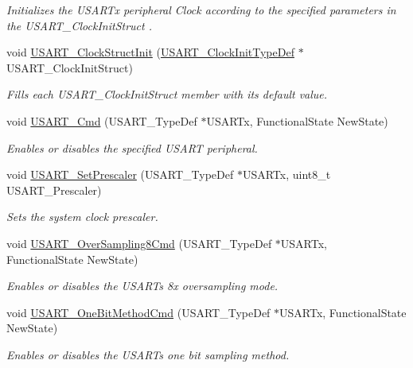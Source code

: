 \begin{DoxyCompactItemize}
\begin{DoxyCompactList}\small\item\em Initializes the U\+S\+A\+R\+Tx peripheral Clock according to the specified parameters in the U\+S\+A\+R\+T\+\_\+\+Clock\+Init\+Struct . \end{DoxyCompactList}\item 
void \mbox{\hyperlink{group___u_s_a_r_t___group1_ga59df27d0adda18b16ee28d47672cc724}{U\+S\+A\+R\+T\+\_\+\+Clock\+Struct\+Init}} (\mbox{\hyperlink{struct_u_s_a_r_t___clock_init_type_def}{U\+S\+A\+R\+T\+\_\+\+Clock\+Init\+Type\+Def}} $\ast$U\+S\+A\+R\+T\+\_\+\+Clock\+Init\+Struct)
\begin{DoxyCompactList}\small\item\em Fills each U\+S\+A\+R\+T\+\_\+\+Clock\+Init\+Struct member with its default value. \end{DoxyCompactList}\item 
void \mbox{\hyperlink{group___u_s_a_r_t___group1_ga45e51626739c5f22a6567c8a85d1d85e}{U\+S\+A\+R\+T\+\_\+\+Cmd}} (U\+S\+A\+R\+T\+\_\+\+Type\+Def $\ast$U\+S\+A\+R\+Tx, Functional\+State New\+State)
\begin{DoxyCompactList}\small\item\em Enables or disables the specified U\+S\+A\+RT peripheral. \end{DoxyCompactList}\item 
void \mbox{\hyperlink{group___u_s_a_r_t___group1_gaf5da8f2eee8245425584d85d4f62cc33}{U\+S\+A\+R\+T\+\_\+\+Set\+Prescaler}} (U\+S\+A\+R\+T\+\_\+\+Type\+Def $\ast$U\+S\+A\+R\+Tx, uint8\+\_\+t U\+S\+A\+R\+T\+\_\+\+Prescaler)
\begin{DoxyCompactList}\small\item\em Sets the system clock prescaler. \end{DoxyCompactList}\item 
void \mbox{\hyperlink{group___u_s_a_r_t___group1_ga3897bab07491d9239f8a238a9a7cddea}{U\+S\+A\+R\+T\+\_\+\+Over\+Sampling8\+Cmd}} (U\+S\+A\+R\+T\+\_\+\+Type\+Def $\ast$U\+S\+A\+R\+Tx, Functional\+State New\+State)
\begin{DoxyCompactList}\small\item\em Enables or disables the U\+S\+A\+RT\textquotesingle{}s 8x oversampling mode. \end{DoxyCompactList}\item 
void \mbox{\hyperlink{group___u_s_a_r_t___group1_ga3ed89ea8765d851510cfe90f7d90cbbb}{U\+S\+A\+R\+T\+\_\+\+One\+Bit\+Method\+Cmd}} (U\+S\+A\+R\+T\+\_\+\+Type\+Def $\ast$U\+S\+A\+R\+Tx, Functional\+State New\+State)
\begin{DoxyCompactList}\small\item\em Enables or disables the U\+S\+A\+RT\textquotesingle{}s one bit sampling method. \end{DoxyCompactList}\end{DoxyCompactItemize}


